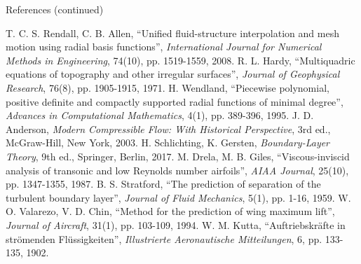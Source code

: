 \documentclass[aspectratio=169,11pt]{beamer}
\begin{document}
\begin{frame}{References (continued)}
\begin{reflist}
  \setcounter{enumi}{10}
   T. C. S. Rendall, C. B. Allen, ``Unified fluid-structure
        interpolation and mesh motion using radial basis functions'',
        \emph{International Journal for Numerical Methods in Engineering},
        74(10), pp. 1519-1559, 2008.
   R. L. Hardy, ``Multiquadric equations of topography and other
        irregular surfaces'', \emph{Journal of Geophysical Research}, 76(8),
        pp. 1905-1915, 1971.
   H. Wendland, ``Piecewise polynomial, positive definite and compactly
        supported radial functions of minimal degree'', \emph{Advances in
        Computational Mathematics}, 4(1), pp. 389-396, 1995.
   J. D. Anderson, \emph{Modern Compressible Flow: With Historical
        Perspective}, 3rd ed., McGraw-Hill, New York, 2003.
   H. Schlichting, K. Gersten, \emph{Boundary-Layer Theory}, 9th ed.,
        Springer, Berlin, 2017.
   M. Drela, M. B. Giles, ``Viscous-inviscid analysis of transonic and
        low Reynolds number airfoils'', \emph{AIAA Journal}, 25(10),
        pp. 1347-1355, 1987.
   B. S. Stratford, ``The prediction of separation of the turbulent
        boundary layer'', \emph{Journal of Fluid Mechanics}, 5(1), pp. 1-16,
        1959.
   W. O. Valarezo, V. D. Chin, ``Method for the prediction of wing
        maximum lift'', \emph{Journal of Aircraft}, 31(1), pp. 103-109, 1994.
   W. M. Kutta, ``Auftriebskr\"afte in str\"omenden Fl\"ussigkeiten'',
        \emph{Illustrierte Aeronautische Mitteilungen}, 6, pp. 133-135, 1902.
\end{reflist}
\end{frame}
\end{document}
